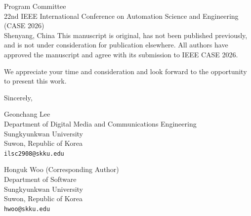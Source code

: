 \documentclass[11pt]{letter}
\begin{document}
\begin{letter}{Program Committee \\
22nd IEEE International Conference on Automation Science and Engineering (CASE 2026) \\
Shenyang, China}
This manuscript is original, has not been published previously, and is not under consideration for publication elsewhere. All authors have approved the manuscript and agree with its submission to IEEE CASE 2026.

We appreciate your time and consideration and look forward to the opportunity to present this work.

\closing{Sincerely,}

Geonchang Lee \\
Department of Digital Media and Communications Engineering \\
Sungkyunkwan University \\
Suwon, Republic of Korea \\
\texttt{ilsc2908@skku.edu}

\vspace{0.5em}

Honguk Woo (Corresponding Author) \\
Department of Software \\
Sungkyunkwan University \\
Suwon, Republic of Korea \\
\texttt{hwoo@skku.edu}

\end{letter}
\end{document}
